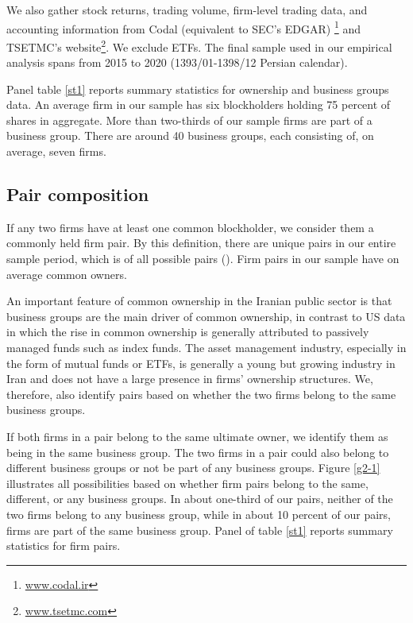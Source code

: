 	We also gather stock returns, trading volume, firm-level trading data, and accounting information from Codal (equivalent to SEC's EDGAR) \footnote{\href{http://www.codal.ir}{www.codal.ir}}
and TSETMC's website\footnote{\href{http://www.tsetmc.com}{www.tsetmc.com}}. We exclude ETFs. The final sample used in our empirical analysis spans from 2015 to 2020 (1393/01-1398/12 Persian calendar). 



Panel  table \ref{st1} reports summary statistics for ownership and business groups data. An average firm in our sample has six blockholders holding 75 percent of shares in aggregate. More than two-thirds of our sample firms are part of a business group. There are around 40 business groups, each consisting of, on average, seven firms.






\subsection{{Pair composition} }

	If any two firms have at least one common blockholder, we consider them a commonly held firm pair. By this definition, there are   unique pairs in our entire sample period, which is of all possible pairs (). Firm pairs in our sample have on average common owners. 
	
	An important feature of common ownership in the Iranian public sector is that business groups are the main driver of common ownership, in contrast to US data in which the rise in common ownership is generally attributed to passively managed funds such as index funds. The asset management industry, especially in the form of mutual funds or ETFs, is generally a young but growing industry in Iran and does not have a large presence in firms' ownership structures. We, therefore, also identify pairs based on whether the two firms belong to the same business groups. 
		
		If both firms in a pair belong to the same ultimate owner, we identify them as being in the same business group. The two firms in a pair could also belong to different business groups or not be part of any business groups. Figure \ref{g2-1} illustrates all possibilities based on whether firm pairs belong to the same, different, or any business groups. In about one-third of our pairs, neither of the two firms belong to any business group, while in about 10 percent of our pairs, firms are part of the same business group. Panel  of table \ref{st1} reports summary statistics for firm pairs.
	
